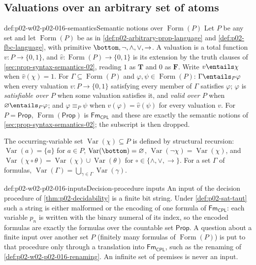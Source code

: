 \subsection{Valuations over an arbitrary set of atoms}
\label{sec:p02-w02-p02-016-semantics}

\begin{hbconvention}{def:p02-w02-p02-016-semantics}{Semantic notions over \(\operatorname{Form}(P)\)}
Let \(P\) be any set and let \(\operatorname{Form}(P)\) be as in
\cref{def:p02-arbitrary-prop-language} and \cref{def:p02-fbc-language}, with
primitive \(\bottom,\neg,\land,\lor,\to\).  A valuation is a total function
\(v:P\to\{0,1\}\), and \(\widehat v:\operatorname{Form}(P)\to\{0,1\}\) is
its extension by the truth clauses of \cref{sec:prop-syntax-semantics-02},
reading \(1\) as \(\mathbf T\) and \(0\) as \(\mathbf F\).
Write \(v\entails\chi\) when \(\widehat v(\chi)=1\).
For \(\Gamma\subseteq\operatorname{Form}(P)\) and
\(\varphi,\psi\in\operatorname{Form}(P)\):
\(\Gamma\entails_P\varphi\) when every valuation \(v:P\to\{0,1\}\) satisfying
every member of \(\Gamma\) satisfies \(\varphi\); \(\varphi\) is
\emph{satisfiable over \(P\)} when some valuation satisfies it, and
\emph{valid over \(P\)} when \(\varnothing\entails_P\varphi\); and
\(\varphi\equiv_P\psi\) when \(\widehat v(\varphi)=\widehat v(\psi)\) for every
valuation \(v\).
For \(P=\mathsf{Prop}\), \(\operatorname{Form}(\mathsf{Prop})\) is
\(\mathsf{Fm}_{\mathsf{CPL}}\) and these are exactly the semantic notions of
\cref{sec:prop-syntax-semantics-02}; the subscript is then dropped.

The occurring-variable set \(\operatorname{Var}(\chi)\subseteq P\) is defined
by structural recursion:
\(\operatorname{Var}(a)=\{a\}\) for \(a\in P\),
\(\operatorname{Var}(\bottom)=\varnothing\),
\(\operatorname{Var}(\neg\chi)=\operatorname{Var}(\chi)\), and
\(\operatorname{Var}(\chi\circ\theta)=
\operatorname{Var}(\chi)\cup\operatorname{Var}(\theta)\) for
\(\circ\in\{\land,\lor,\to\}\).  For a set \(\Gamma\) of formulas,
\(\operatorname{Var}(\Gamma)=\bigcup_{\gamma\in\Gamma}\operatorname{Var}(\gamma)\).
\end{hbconvention}

\begin{hbconvention}{def:p02-w02-p02-016-inputs}{Decision-procedure inputs}
An input of the decision procedure of \cref{thm:p02-decidability} is a finite
bit string.  Under \cref{def:p02-sat-taut} such a string is either malformed
or the encoding of one formula of \(\mathsf{Fm}_{\mathsf{CPL}}\): each
variable \(p_n\) is written with the binary numeral of its index, so the
encoded formulas are exactly the formulas over the countable set
\(\mathsf{Prop}\).  A question about a finite input over another set \(P\)
(finitely many formulas of \(\operatorname{Form}(P)\)) is put to that
procedure only through a translation into \(\mathsf{Fm}_{\mathsf{CPL}}\),
such as the renaming of \cref{def:p02-w02-p02-016-renaming}.  An infinite set
of premises is never an input.
\end{hbconvention}

